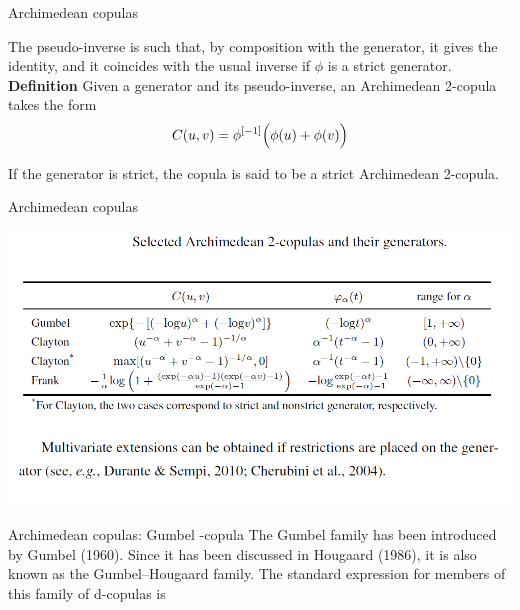 \documentclass[11pt]{beamer}
\theoremstyle{plain}
\theoremstyle{definition}
\theoremstyle{remark}
\begin{document}
%
\begin{frame}{Archimedean copulas}


The pseudo-inverse is such that, by composition with the generator, it gives the identity, and it coincides with the usual      
	inverse if $\phi$ is a strict generator. \\[2ex]

\noindent\textbf{Definition} Given a generator and its pseudo-inverse, an Archimedean 2-copula takes the form
\begin{equation}
C(u, v) = \phi^{[-1]}\Bigl( \phi(u) + \phi(v) \Bigr)
\end{equation}

If the generator is strict, the copula is said to be a strict Archimedean 2-copula.				  						  

\end{frame}
%
\begin{frame}{Archimedean copulas}
\begin{center}
\includegraphics[scale=.45]{fig/copule_archimedee_tabella.PNG} 
\end{center}
\end{frame}
%
\begin{frame}{Archimedean copulas: Gumbel -copula}
The Gumbel family has been introduced by Gumbel (1960). Since it has been
discussed in Hougaard (1986), it is also known as the Gumbel–Hougaard family.
The standard expression for members of this family of d-copulas is


\end{frame}
\end{document}
